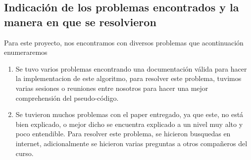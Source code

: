 \documentclass[a4paper,10pt]{article}
\begin{document}
\subsection{Indicación de los problemas encontrados y la manera en que se resolvieron}
\hspace{2cm}
Para este proyecto, nos encontramos con diversos problemas que acontinuación enumeraremos
\begin{enumerate}
\item {Se tuvo varios problemas encontrando una documentación válida para hacer la implementacion de este algoritmo, para resolver este problema, tuvimos varias sesiones o reuniones entre nosotros para hacer una mejor comprehensión del pseudo-código.  }
\item {Se tuvieron muchos problemas con el paper entregado, ya que este, no está bien explicado, o mejor dicho se encuentra explicado a un nivel muy alto y poco entendible. Para resolver este problema, se hicieron busquedas en internet, adicionalmente se hicieron varias preguntas a otros compañeros del curso. }

\end{enumerate}
\end{document}
